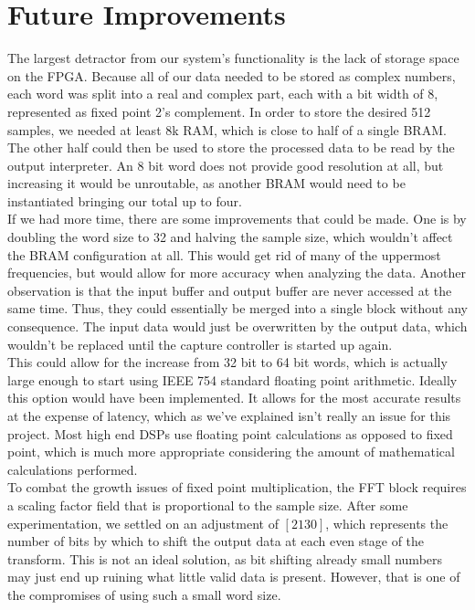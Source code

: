 \documentclass[12pt]{article}
\begin{document}
  \section*{Future Improvements}
    The largest detractor from our system's functionality is the lack of storage space on the FPGA.
    Because all of our data needed to be stored as complex numbers, each word was split into a real and complex part, each with a bit width of 8, represented as fixed point 2's complement.
    In order to store the desired 512 samples, we needed at least 8k RAM, which is close to half of a single BRAM.
    The other half could then be used to store the processed data to be read by the output interpreter.
    An 8 bit word does not provide good resolution at all, but increasing it would be unroutable, as another BRAM would need to be instantiated bringing our total up to four.\\

    If we had more time, there are some improvements that could be made.
    One is by doubling the word size to 32 and halving the sample size, which wouldn't affect the BRAM configuration at all.
    This would get rid of many of the uppermost frequencies, but would allow for more accuracy when analyzing the data.
    Another observation is that the input buffer and output buffer are never accessed at the same time.
    Thus, they could essentially be merged into a single block without any consequence.
    The input data would just be overwritten by the output data, which wouldn't be replaced until the capture controller is started up again.\\

    This could allow for the increase from 32 bit to 64 bit words, which is actually large enough to start using IEEE 754 standard floating point arithmetic.
    Ideally this option would have been implemented. 
    It allows for the most accurate results at the expense of latency, which as we've explained isn't really an issue for this project.
    Most high end DSPs use floating point calculations as opposed to fixed point, which is much more appropriate considering the amount of mathematical calculations performed.\\

    To combat the growth issues of fixed point multiplication, the FFT block requires a scaling factor field that is proportional to the sample size.
    After some experimentation, we settled on an adjustment of $[2 1 3 0]$, which represents the number of bits by which to shift the output data at each even stage of the transform.
    This is not an ideal solution, as bit shifting already small numbers may just end up ruining what little valid data is present.
    However, that is one of the compromises of using such a small word size.\\ 
\end{document}

